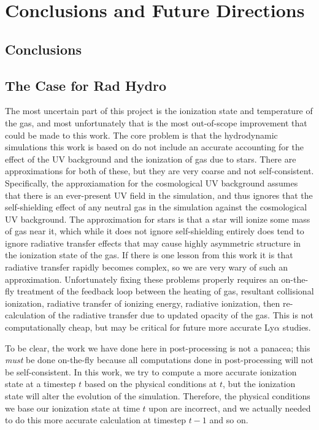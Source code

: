 \chapter{Conclusions and Future Directions}
\label{sec:discussion}

\section{Conclusions}
\label{sec:conclusions}


\section{The Case for Rad Hydro}
The most uncertain part of this project is the ionization state and temperature of the gas, and most unfortunately that is the most out-of-scope improvement that could be made to this work.
The core problem is that the hydrodynamic simulations this work is based on do not include an accurate accounting for the effect of the UV background and the ionization of gas due to stars.
There are approximations for both of these, but they are very coarse and not self-consistent.
Specifically, the approxiamation for the cosmological UV background assumes that there is an ever-present UV field in the simulation, and thus ignores that the self-shielding effect of any neutral gas in the simulation against the cosmological UV background.
The approximation for stars is that a star will ionize some mass of gas near it, which while it does not ignore self-shielding entirely does tend to ignore radiative transfer effects that may cause highly asymmetric structure in the ionization state of the gas.
If there is one lesson from this work it is that radiative transfer rapidly becomes complex, so we are very wary of such an approximation.
Unfortunately fixing these problems properly requires an on-the-fly treatment of the feedback loop between the heating of gas, resultant collisional ionization, radiative transfer of ionizing energy, radiative ionization, then re-calculation of the radiative transfer due to updated opacity of the gas.
This is not computationally cheap, but may be critical for future more accurate Ly$\alpha$ studies.

To be clear, the work we have done here in post-processing is not a panacea; this \emph{must} be done on-the-fly because all computations done in post-processing will not be self-consistent.
In this work, we try to compute a more accurate ionization state at a timestep $t$ based on the physical conditions at $t$, but the ionization state will alter the evolution of the simulation.
Therefore, the physical conditions we base our ionization state at time $t$ upon are incorrect, and we actually needed to do this more accurate calculation at timestep $t-1$ and so on.

